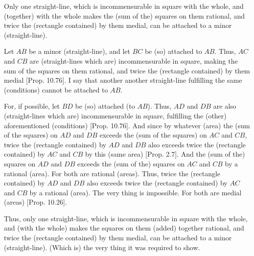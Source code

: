 \begin{Parallel}{}{}
{Only one straight-line, which is incommensurable
in square with the whole, and (together) with the whole makes the (sum of the) squares on them
rational, and twice the (rectangle contained) by them medial, can be
attached to a minor (straight-line).

\epsfysize=0.25in 
\centerline{}

Let $AB$ be a minor (straight-line), and let $BC$ be (so) attached to $AB$.
Thus, $AC$ and $CB$ are (straight-lines which are) incommensurable  in square, making the sum of
the squares on them rational, and twice the (rectangle contained) by them
medial [Prop. 10.76]. I say that another
another straight-line fulfilling the same (conditions) cannot be
attached to $AB$.

For, if possible, let $BD$ be (so) attached (to $AB$). Thus, $AD$
and $DB$ are also (straight-lines which are) incommensurable in square, fulfilling the (other) aforementioned
(conditions) [Prop. 10.76]. And since
by whatever (area) the (sum of the squares) on $AD$ and $DB$
exceeds the (sum of the squares) on $AC$ and $CB$, 
twice the (rectangle contained) by $AD$ and $DB$ also exceeds
twice the (rectangle contained) by $AC$ and $CB$  by this (same area) [Prop. 2.7]. And the (sum of the) squares on
$AD$ and $DB$ exceeds the (sum of the) squares on $AC$ and $CB$
by a rational (area). For both are rational (areas). Thus, twice the
(rectangle contained) by $AD$ and $DB$ also exceeds
twice the (rectangle contained) by $AC$ and $CB$ by a rational (area).
The very thing is impossible. For both are medial (areas) [Prop. 10.26].

Thus,  only one straight-line, which is  incommensurable in square
with the whole, and (with the whole) makes the  squares on them
(added) together rational, and twice the (rectangle contained) by them medial, can be
attached to a minor (straight-line). (Which is) the very thing it was required to
show.}
\end{Parallel}


\vspace{7pt}{\footnotesize\noindent$^\dag$ This proposition is equivalent to 
Prop.~10.45, with minus signs instead of plus signs.}

